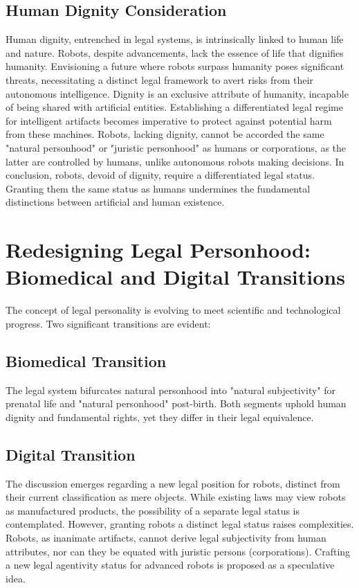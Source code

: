 \subsection{Human Dignity Consideration}

Human dignity, entrenched in legal systems, is intrinsically linked to human life and nature. Robots, despite advancements, lack the essence of life that dignifies humanity. Envisioning a future where robots surpass humanity poses significant threats, necessitating a distinct legal framework to avert risks from their autonomous intelligence.
\newline
Dignity is an exclusive attribute of humanity, incapable of being shared with artificial entities. Establishing a differentiated legal regime for intelligent artifacts becomes imperative to protect against potential harm from these machines.
\newline
Robots, lacking dignity, cannot be accorded the same "natural personhood" or "juristic personhood" as humans or corporations, as the latter are controlled by humans, unlike autonomous robots making decisions.
\newline
In conclusion, robots, devoid of dignity, require a differentiated legal status. Granting them the same status as humans undermines the fundamental distinctions between artificial and human existence.

\section{Redesigning Legal Personhood: Biomedical and Digital Transitions}
The concept of legal personality is evolving to meet scientific and technological progress. Two significant transitions are evident:

\subsection{Biomedical Transition}
The legal system bifurcates natural personhood into "natural subjectivity" for prenatal life and "natural personhood" post-birth. Both segments uphold human dignity and fundamental rights, yet they differ in their legal equivalence.

\subsection{Digital Transition}
The discussion emerges regarding a new legal position for robots, distinct from their current classification as mere objects. While existing laws may view robots as manufactured products, the possibility of a separate legal status is contemplated.
\newline
However, granting robots a distinct legal status raises complexities. Robots, as inanimate artifacts, cannot derive legal subjectivity from human attributes, nor can they be equated with juristic persons (corporations). Crafting a new legal agentivity status for advanced robots is proposed as a speculative idea.

